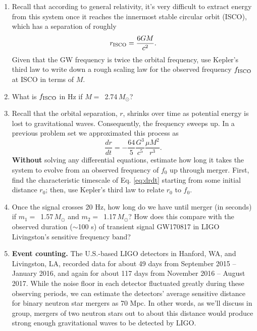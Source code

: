 \documentclass[11pt]{article}
\begin{document}
\begin{enumerate}

\item Recall that according to general relativity, it's very difficult to extract energy from this system once it reaches the innermost stable
circular orbit (ISCO), which has a separation of roughly
\begin{equation}\label{eq:rISCO}
r_{\rm ISCO} = \frac{6GM}{c^2}.
\end{equation}
Given that the GW frequency is twice the orbital frequency, use Kepler's third law to write down a rough scaling law for the observed frequency
$f_{\rm ISCO}$ at ISCO in terms of $M$.

\item What is $f_{\rm ISCO}$ in Hz if $M =$\, 2.74\,$M_{\odot}$?

\item Recall that the orbital separation, $r$, shrinks over time as potential energy is lost to gravitational waves. Consequently, the frequency
sweeps up. In a previous problem set we approximated this process as
\begin{equation}\label{eq:drdt}
\frac{dr}{dt} = - \frac{64}{5} \frac{G^3}{c^5} \frac{\mu M^2}{r^3}.
\end{equation}
\textbf{Without} solving any differential equations, estimate how long it takes the system to evolve from an observed frequency of $f_0$ up
through merger. First, find the characteristic timescale of Eq. \ref{eq:drdt} starting from some initial distance $r_0$; then, use Kepler's
third law to relate $r_0$ to $f_0$.

\item Once the signal crosses 20 Hz, how long do we have until merger (in seconds) if $m_1 = $\, 1.57\,$M_{\odot}$ and $m_2 =$\,
1.17\,$M_{\odot}$? How does this compare with the observed duration ($\sim$100 s) of transient signal GW170817 in LIGO Livingston's sensitive
frequency band?

\item \textbf{Event counting.} The U.S.-based LIGO detectors in Hanford, WA, and Livingston, LA, recorded data for about 49 days from September
2015 -- January 2016, and again for about 117 days from November 2016 -- August 2017. While the noise floor in each detector fluctuated greatly
during these observing periods, we can estimate the detectors' average sensitive distance for binary neutron star mergers as 70 Mpc. In other
words, as we'll discuss in group, mergers of two neutron stars out to about this distance would produce strong enough gravitational waves to be
detected by LIGO.


\end{enumerate}
\end{document}
